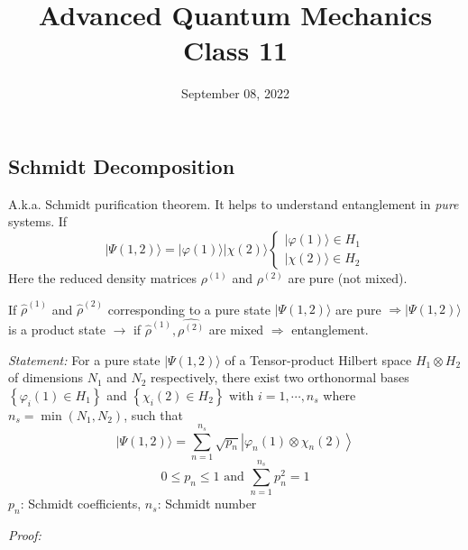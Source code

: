 \documentclass[12pt]{article}
\title{Advanced Quantum Mechanics\\Class 11}
\date{September 08, 2022}                                           %
\newcommand{\be}{\begin{equation}}
\newcommand{\ee}{\end{equation}}
\begin{document}
\maketitle

\subsection{Schmidt Decomposition}

A.k.a. Schmidt purification theorem.
It helps to understand entanglement in \emph{pure} systems.
If
\[
|\Psi(1,2)\rangle=|\varphi(1)\rangle|\chi(2)\rangle\left\{\begin{array}{l}|\varphi(1)\rangle \in H_{1} \\ |\chi(2)\rangle \in H_{2}\end{array}\right.
\]
Here the reduced density matrices \(\rho^{(1)}\) and \(\rho^{(2)}\)
are pure (not mixed).

If \(\hat{\rho}^{(1)}\) and \(\hat{\rho}^{(2)}\) corresponding to a pure state
\(|\Psi(1,2)\rangle\) are pure \(\Rightarrow|\Psi(1,2)\rangle\) is a product state
\(\rightarrow\) if \(\hat{\rho}^{(1)}, \hat{\rho^{(2)}}\) are mixed \(\Rightarrow\) entanglement.

\emph{Statement:} For a pure state \(|\Psi(1,2)\rangle\) of a
Tensor-product Hilbert space \(H_{1}\otimes H_{2}\)
of dimensions \(N_{1}\) and \(N_{2}\) respectively,
there exist two orthonormal bases
\(\left\{\varphi_{i}(1) \in H_{1}\right\}\) and 
\(\left\{\chi_{i}(2) \in H_{2}\right\}\) with \(i=1, \cdots, n_{s}\)
where \(n_{s}=\min\left(N_{1}, N_{2}\right)\), such that
\be
|\Psi(1,2)\rangle=\sum_{n=1}^{n_{s}} \sqrt{p_{n}}\left|\varphi_{n}(1) \otimes \chi_{n}(2)\right\rangle
\label{eq:g128}
\ee
\be
0 \leqslant p_{n} \leqslant 1 \text{ and }\sum_{n=1}^{n_{s}} p_{n}^{2}=1
\label{eq:g129}
\ee
$p_{n}$: Schmidt coefficients, \(n_{s}\): Schmidt number


\emph{Proof:}
\end{document}
